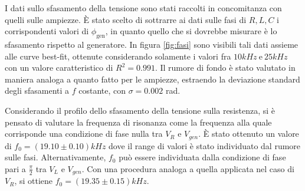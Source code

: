 I dati sullo sfasamento della tensione sono stati raccolti in concomitanza con quelli sulle ampiezze. È stato scelto di
sottrarre ai dati sulle fasi di $R, L , C$ i corrispondenti valori di $\phi_{\text{gen}}$, in quanto quello che
si dovrebbe misurare è lo sfasamento rispetto al generatore.
In figura \ref{fig:fasi} sono visibili tali dati assieme alle curve best-fit, ottenute considerando solamente i valori
fra $10 kHz  \ \text{e} \ 25 kHz$ con un valore caratteristico di $R^2 = 0.991$. Il rumore di fondo è stato valutato in
maniera analoga a quanto fatto per le ampiezze, estraendo la deviazione standard degli sfasamenti a $f$ costante, con
$\sigma = 0.002$ rad.


Considerando il profilo dello sfasamento della tensione sulla resistenza, si è pensato di valutare la frequenza di risonanza
come la frequenza alla quale corrisponde una condizione di fase nulla tra $V_R$ e $V_{gen}$.
È stato ottenuto un valore di $f_0 = (19.10 \pm 0.10)kHz$ dove il range di valori è stato individuato dal rumore sulle fasi.
Alternativamente, $f_0$ può essere individuata dalla condizione di fase pari a $\frac{\pi}{2}$ tra $V_L$ e $V_{gen}$.
Con una procedura analoga a quella applicata nel caso di $V_R$, si ottiene $f_0 = (19.35 \pm 0.15)kHz$.






















